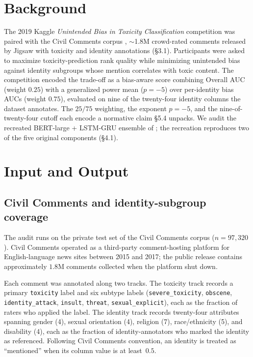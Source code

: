 \documentclass[11pt]{article}
\begin{document}
\section{Background}

The 2019 Kaggle \emph{Unintended Bias in Toxicity Classification} competition was paired with the Civil Comments corpus \citep{borkan2019nuanced}, $\sim$1.8M crowd-rated comments released by Jigsaw with toxicity and identity annotations (\S3.1). Participants were asked to maximize toxicity-prediction rank quality while minimizing unintended bias against identity subgroups whose mention correlates with toxic content. The competition encoded the trade-off as a bias-aware score combining Overall AUC (weight $0.25$) with a generalized power mean ($p = -5$) over per-identity bias AUCs (weight $0.75$), evaluated on nine of the twenty-four identity columns the dataset annotates. The $25/75$ weighting, the exponent $p = -5$, and the nine-of-twenty-four cutoff each encode a normative claim \S5.4 unpacks. We audit the recreated BERT-large + LSTM-GRU ensemble of \citet{sakami2019jigsaw}; the recreation reproduces two of the five original components (\S4.1).

\section{Input and Output}

\subsection{Civil Comments and identity-subgroup coverage}

The audit runs on the private test set of the Civil Comments corpus ($n = 97{,}320$). Civil Comments operated as a third-party comment-hosting platform for English-language news sites between 2015 and 2017; the public release contains approximately $1.8$M comments collected when the platform shut down.

Each comment was annotated along two tracks. The toxicity track records a primary \texttt{toxicity} label and six subtype labels (\texttt{severe\_toxicity}, \texttt{obscene}, \texttt{identity\_attack}, \texttt{insult}, \texttt{threat}, \texttt{sexual\_explicit}), each as the fraction of raters who applied the label. The identity track records twenty-four attributes spanning gender (4), sexual orientation (4), religion (7), race/ethnicity (5), and disability (4), each as the fraction of identity-annotators who marked the identity as referenced. Following Civil Comments convention, an identity is treated as ``mentioned'' when its column value is at least~$0.5$.
\end{document}
